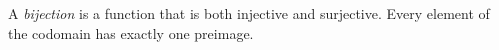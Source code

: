 
A \emph{bijection} is a function that is both injective and surjective. Every element of the codomain has exactly one preimage.
